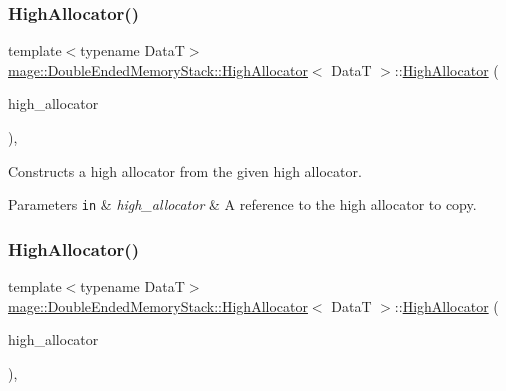 \subsubsection{\texorpdfstring{High\+Allocator()}{HighAllocator()}\hspace{0.1cm}{\footnotesize\ttfamily [1/4]}}
{\footnotesize\ttfamily template$<$typename DataT$>$ \\
\hyperlink{structmage_1_1_double_ended_memory_stack_1_1_high_allocator}{mage\+::\+Double\+Ended\+Memory\+Stack\+::\+High\+Allocator}$<$ DataT $>$\+::\hyperlink{structmage_1_1_double_ended_memory_stack_1_1_high_allocator}{High\+Allocator} (\begin{DoxyParamCaption}\item[{const \hyperlink{structmage_1_1_double_ended_memory_stack_1_1_high_allocator}{High\+Allocator}$<$ DataT $>$ \&}]{high\+\_\+allocator }\end{DoxyParamCaption})\hspace{0.3cm}{\ttfamily [default]}, {\ttfamily [noexcept]}}

Constructs a high allocator from the given high allocator.


\begin{DoxyParams}[1]{Parameters}
\mbox{\tt in}  & {\em high\+\_\+allocator} & A reference to the high allocator to copy. \\
\hline
\end{DoxyParams}
\hypertarget{structmage_1_1_double_ended_memory_stack_1_1_high_allocator_a8124c4d3052cd9e3b368ecbbc89a35e1}{}\label{structmage_1_1_double_ended_memory_stack_1_1_high_allocator_a8124c4d3052cd9e3b368ecbbc89a35e1} 
\subsubsection{\texorpdfstring{High\+Allocator()}{HighAllocator()}\hspace{0.1cm}{\footnotesize\ttfamily [2/4]}}
{\footnotesize\ttfamily template$<$typename DataT$>$ \\
\hyperlink{structmage_1_1_double_ended_memory_stack_1_1_high_allocator}{mage\+::\+Double\+Ended\+Memory\+Stack\+::\+High\+Allocator}$<$ DataT $>$\+::\hyperlink{structmage_1_1_double_ended_memory_stack_1_1_high_allocator}{High\+Allocator} (\begin{DoxyParamCaption}\item[{\hyperlink{structmage_1_1_double_ended_memory_stack_1_1_high_allocator}{High\+Allocator}$<$ DataT $>$ \&\&}]{high\+\_\+allocator }\end{DoxyParamCaption})\hspace{0.3cm}{\ttfamily [default]}, {\ttfamily [noexcept]}}

